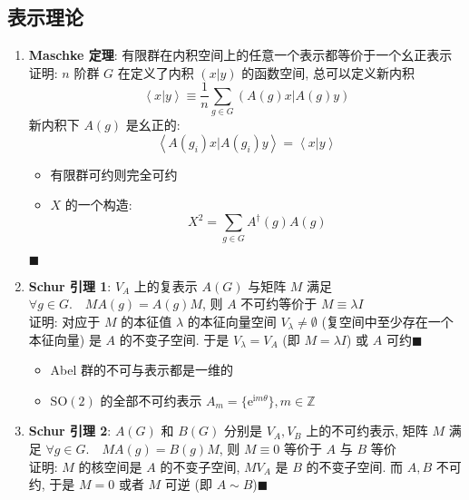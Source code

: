 \documentclass[12pt,a4paper]{article}%
\numberwithin{equation}{section}%
\newcommand\mi{\mathrm{i}}
\newcommand\e{\mathrm{e}}%
\newcommand\qed{$\blacksquare$}
\begin{document}
\subsection{表示理论} %
\label{sub:reps_thms}
\begin{enumerate}
	\item \textbf{Maschke 定理}: 有限群在内积空间上的任意一个表示都等价于一个幺正表示\\
	证明: $n$ 阶群 $G$ 在定义了内积 $(x|y)$ 的函数空间, 总可以定义新内积
	\begin{equation}
		\left\langle x|y\right\rangle \equiv \frac 1n\sum_{g\in G} \left(A(g)x|A(g)y\right)
	\end{equation}
	新内积下 $A(g)$ 是幺正的:
	\begin{equation}
		\left\langle A(g_i)x|A(g_i)y\right\rangle = \left\langle x|y\right\rangle
	\end{equation}
	\begin{itemize}
		\item 有限群可约则完全可约
		\item $X$ 的一个构造: 
		\begin{equation}
			X^2 = \sum_{g\in G}A^\dagger(g)A(g)
		\end{equation}
	\end{itemize}\qed
	\item \textbf{Schur 引理 1}: $V_A$ 上的复表示 $A(G)$ 与矩阵 $M$ 满足 $\forall g\in G.\quad MA(g) = A(g)M $, 则 $A$ 不可约等价于 $M\equiv \lambda I$\\
	证明: 对应于 $M$ 的本征值 $\lambda$ 的本征向量空间 $V_\lambda \neq\emptyset$ (复空间中至少存在一个本征向量) 是 $A$ 的不变子空间. 于是 $V_\lambda = V_A$ (即 $M=\lambda I$) 或 $A$ 可约\qed
	\begin{itemize}
		\item Abel 群的不可与表示都是一维的
		\item $\mbox{SO}(2)$ 的全部不可约表示 $A_m = \{\e^{\mi m\theta}\}, m\in\mathbb Z$
	\end{itemize}
	\item \textbf{Schur 引理 2}: $A(G)$ 和 $B(G)$ 分别是 $V_A, V_B$ 上的不可约表示, 矩阵 $M$ 满足 $\forall g\in G.\quad MA(g) = B(g)M$, 则 $M\equiv 0$ 等价于 $A$ 与 $B$ 等价\\
	证明: $M$ 的核空间是 $A$ 的不变子空间, $MV_A$ 是 $B$ 的不变子空间. 而 $A,B$ 不可约, 于是 $M=0$ 或者 $M$ 可逆 (即 $A\sim B$)\qed
\end{enumerate}
\end{document}
